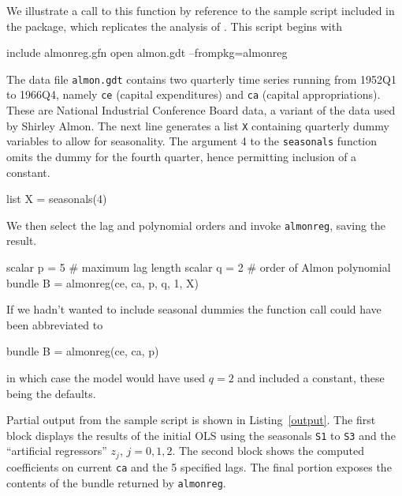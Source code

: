 \documentclass{article}
\begin{document}
We illustrate a call to this function by reference to the sample
script included in the package, which replicates the analysis of
\cite{almon65}. This script begins with
%
\begin{code}
include almonreg.gfn
open almon.gdt --frompkg=almonreg
\end{code}
%
The data file \texttt{almon.gdt} contains two quarterly time series running
from 1952Q1 to 1966Q4, namely \texttt{ce} (capital expenditures) and
\texttt{ca} (capital appropriations). These are National Industrial
Conference Board data, a variant of the data used by Shirley Almon. The next
line generates a list \texttt{X} containing quarterly dummy variables to
allow for seasonality. The argument 4 to the \texttt{seasonals} function
omits the dummy for the fourth quarter, hence permitting inclusion of a
constant.
%
\begin{code}
list X = seasonals(4)
\end{code}
%
We then select the lag and polynomial orders and invoke
\texttt{almonreg}, saving the result.
%
\begin{code}
scalar p = 5 # maximum lag length
scalar q = 2 # order of Almon polynomial
bundle B = almonreg(ce, ca, p, q, 1, X)
\end{code}
%
If we hadn't wanted to include seasonal dummies the function call could have
been abbreviated to
\begin{code}
bundle B = almonreg(ce, ca, p)
\end{code}
%
in which case the model would have used $q = 2$ and included a
constant, these being the defaults.

Partial output from the sample script is shown in Listing~\ref{output}. The
first block displays the results of the initial OLS using the seasonals
\texttt{S1} to \texttt{S3} and the ``artificial regressors'' $z_j$,
$j=0,1,2$.  The second block shows the computed coefficients on current
\texttt{ca} and the 5 specified lags. The final portion exposes the contents
of the bundle returned by \texttt{almonreg}.
\end{document}
